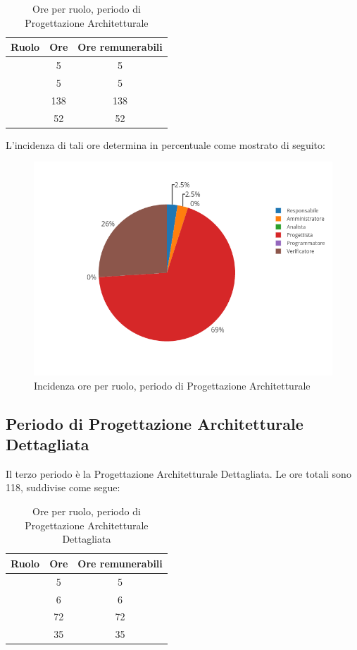 \begin{table}[H]
	\begin{center}
		\begin{tabular}{|c|c|c|}
			\hline
			\textbf{Ruolo}	& \textbf{Ore}	& \textbf{Ore remunerabili} \\
			\hline
			\Res	&	5	&	5	\\
			\hline
			\Amm	&	5	&	5	\\
			\hline
			\Prog   &	138   &	138	\\
			\hline
			\Ver	&	52	&	52	\\
			\hline
		\end{tabular}
	\end{center}
	\caption{Ore per ruolo, periodo di Progettazione Architetturale}
\end{table}

L'incidenza di tali ore determina in percentuale come mostrato di seguito:
\begin{figure}[H]
	\centering
	\includegraphics[scale=0.6]{img/ProgettazioneArchitetturale.png}
	\caption{Incidenza ore per ruolo, periodo di Progettazione Architetturale}
\end{figure}

\subsection{Periodo di Progettazione Architetturale Dettagliata}
Il terzo periodo è la Progettazione Architetturale Dettagliata. Le ore totali sono 118, suddivise come segue:

\begin{table}[H]
	\begin{center}
		\begin{tabular}{|c|c|c|}
			\hline
			\textbf{Ruolo}	& \textbf{Ore}	& \textbf{Ore remunerabili} \\
			\hline
			\Res	&	5	&	5 \\
			\hline
			\Amm	&	6	&	6	\\
			\hline
			\Prog   &	72   &	72	\\
			\hline
			\Ver	&	35	&	35	\\
			\hline
		\end{tabular}
	\end{center}
	\caption{Ore per ruolo, periodo di Progettazione Architetturale Dettagliata}
\end{table}

